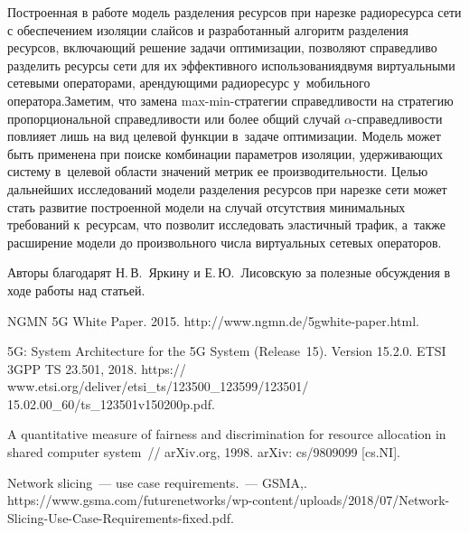 \begin{multicols}{2}
  Построенная в работе модель разделения ресурсов при нарезке 
радиоресурса сети с обеспечением изоляции слайсов и разработанный 
алгоритм разделения ресурсов, включающий решение задачи оптимизации, 
позволяют справедливо разделить ресурсы сети для их эффективного 
использования\linebreak двумя виртуальными сетевыми операторами, арендующими 
радиоресурс у~мобильного оператора.\linebreak Заметим, что замена  
max-min-стра\-те\-гии справедливости на стратегию пропорциональной 
справедливости или более общий случай  
$\alpha$-спра\-вед\-ли\-вости повлияет лишь на вид целевой функции 
в~задаче оптимизации. Модель может быть применена при поиске 
комбинации па\-ра\-мет\-ров изоляции, удерживающих сис\-те\-му в~целевой  
об\-ласти значений мет\-рик ее производительности. Целью дальнейших 
исследований модели разделения ресурсов при нарезке сети может стать 
развитие построенной модели на случай отсутствия минимальных 
требований к~ресурсам, что позволит исследовать элас\-тич\-ный трафик, 
а~также расширение модели до произвольного чис\-ла виртуальных сетевых 
операторов.
{

}
  
  \bigskip
  
  Авторы благодарят Н.\,В.~Яркину и Е.\,Ю.~Лисовскую за полезные 
обсуждения в ходе работы над статьей.
  
{\small\frenchspacing
 {%
 \begin{thebibliography}{99}
\vspace*{3pt}

NGMN 5G White Paper. 2015. {\sf http://www.ngmn.de/\linebreak 5gwhite-paper.html}.

5G: System Architecture for the 5G System (Release~15). Version 15.2.0. ETSI 3GPP TS 23.501, 2018. 
{\sf https://\linebreak
www.etsi.org/deliver/etsi\_ts/123500\_123599/123501/ 15.02.00\_60/ts\_123501v150200p.pdf}. 

 A quantitative measure of fairness and discrimination 
for resource allocation in shared computer system~// arXiv.org, 1998. 
\mbox{arXiv}: cs/9809099 [cs.NI].

Network slicing~--- use case requirements.~--- \mbox{GSMA},. {\sf  
https://www.gsma.com/futurenetworks/wp-content/uploads/2018/07/Network-Slicing-Use-Case-Requirements-fixed.pdf}.


\end{thebibliography}}}
\end{multicols}
